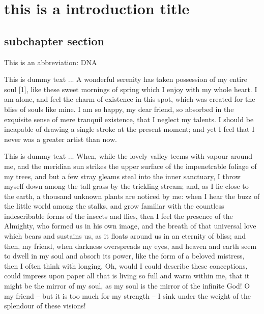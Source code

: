 \documentclass[letterpaper,oneside,11pt]{book}
\begin{document}
	\afterpreface

	\chapter{this is a introduction title}\label{intro}

\section{subchapter section}\label{subchapter-section}


This is an abbreviation: DNA 



This is dummy text ... A wonderful serenity has taken possession of my entire soul [1], like these sweet mornings of spring which I enjoy with my whole heart. I am alone, and feel the charm of existence in this spot, which was created for the bliss of souls like mine. I am so happy, my dear friend, so absorbed in the exquisite sense of mere tranquil existence, that I neglect my talents. I should be incapable of drawing a single stroke at the present moment; and yet I feel that I never was a greater artist than now.



This is dummy text ... When, while the lovely valley teems with vapour around me, and the meridian sun strikes the upper surface of the impenetrable foliage of my trees, and but a few stray gleams steal into the inner sanctuary, I throw myself down among the tall grass by the trickling stream; and, as I lie close to the earth, a thousand unknown plants are noticed by me: when I hear the buzz of the little world among the stalks, and grow familiar with the countless indescribable forms of the insects and flies, then I feel the presence of the Almighty, who formed us in his own image, and the breath of that universal love which bears and sustains us, as it floats around us in an eternity of bliss; and then, my friend, when darkness overspreads my eyes, and heaven and earth seem to dwell in my soul and absorb its power, like the form of a beloved mistress, then I often think with longing, Oh, would I could describe these conceptions, could impress upon paper all that is living so full and warm within me, that it might be the mirror of my soul, as my soul is the mirror of the infinite God! O my friend -- but it is too much for my strength -- I sink under the weight of the splendour of these visions!
\end{document}
